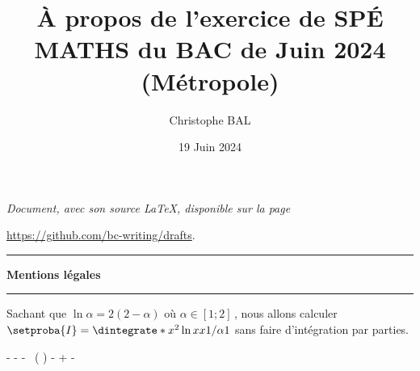 \documentclass[12pt]{amsart}
\begin{document}
\title{À propos de l'exercice de SPÉ MATHS du BAC de Juin 2024 (Métropole)}
\author{Christophe BAL}
\date{19 Juin 2024}
\maketitle


\begin{center}
	\itshape
	Document, avec son source \LaTeX, disponible sur la page
	
	\url{https://github.com/bc-writing/drafts}.
\end{center}


\bigskip


\begin{center}
	\hrule\vspace{.3em}
	{
		\fontsize{1.35em}{1em}\selectfont
		\textbf{Mentions \og légales \fg}
	}
			
	\vspace{0.45em}
	\doclicenseThis
	\hrule
\end{center}

\bigskip

Sachant que $\ln \alpha = 2(2 - \alpha)$ où $\alpha \in [1 ; 2]$\,, nous allons calculer $\setproba{I} = \dintegrate*{x^2 \ln x}{x}{1 / \alpha}{1}$ sans faire d'intégration par parties.

\medskip

\begin{stepcalc}[style=sar]
\explnext{}
	-
	-
\explnext{}
\explnext{}
\explnext{}
\explnext{}
	-
	 \, \ln \big(  \big)%
	-
	+
	-
\explnext{}
\explnext{}
\end{stepcalc}
\end{document}
